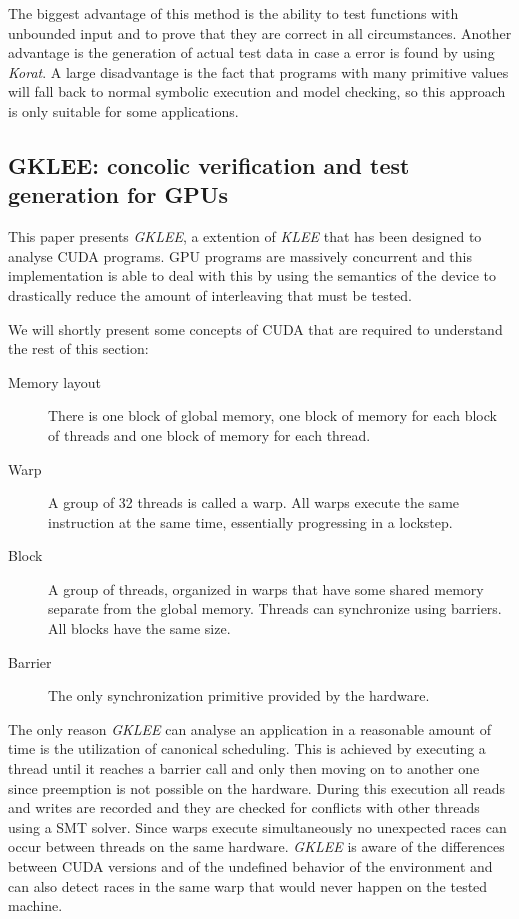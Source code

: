\documentclass[10pt]{llncs}
\begin{document}
The biggest advantage of this method is the ability to test functions with unbounded input and to prove that they are correct in all circumstances. Another advantage is the generation of actual test data in case a error is found by using \emph{Korat}. A large disadvantage is the fact that programs with many primitive values will fall back to normal symbolic execution and model checking, so this approach is only suitable for some applications.

\subsection{GKLEE: concolic verification and test generation for GPUs \cite{base7}}

This paper presents \emph{GKLEE}, a extention of \emph{KLEE} \cite{klee} that has been designed to analyse CUDA programs. GPU programs are massively concurrent and this implementation is able to deal with this by using the semantics of the device to drastically reduce the amount of interleaving that must be tested.

We will shortly present some concepts of CUDA that are required to understand the rest of this section:

\begin{description}
	\item[Memory layout] There is one block of global memory, one block of memory for each block of threads and one block of memory for each thread.
	\item[Warp] A group of 32 threads is called a warp. All warps execute the same instruction at the same time, essentially progressing in a lockstep. 
	\item[Block] A group of threads, organized in warps that have some shared memory separate from the global memory. Threads can synchronize using barriers. All blocks have the same size.
	\item[Barrier] The only synchronization primitive provided by the hardware.
\end{description}

The only reason \emph{GKLEE} can analyse an application in a reasonable amount of time is the utilization of canonical scheduling. This is achieved by executing a thread until it reaches a barrier call and only then moving on to another one since preemption is not possible on the hardware. During this execution all reads and writes are recorded and they are checked for conflicts with other threads using a SMT solver. Since warps execute simultaneously no unexpected races can occur between threads on the same hardware. \emph{GKLEE} is aware of the differences between CUDA versions and of the undefined behavior of the environment and can also detect races in the same warp that would never happen on the tested machine.
\end{document}
